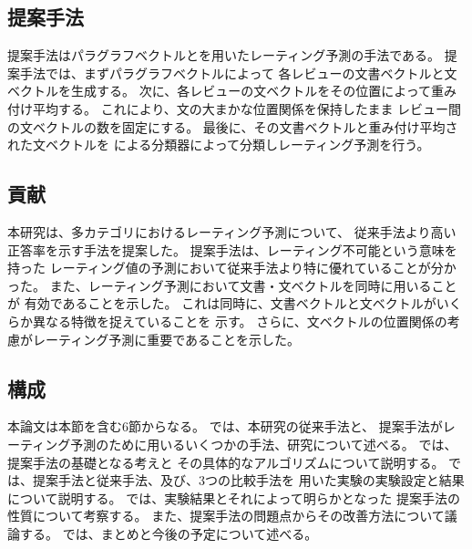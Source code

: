 \subsection{提案手法}

提案手法はパラグラフベクトルと\nn を用いたレーティング予測の手法である。
提案手法では、まずパラグラフベクトル\cite{quoc14}によって
各レビューの文書ベクトルと文ベクトルを生成する。
次に、各レビューの文ベクトルをその位置によって重み付け平均する。
これにより、文の大まかな位置関係を保持したまま
レビュー間の文ベクトルの数を固定にする。
最後に、その文書ベクトルと重み付け平均された文ベクトルを
\nn による分類器によって分類しレーティング予測を行う。


\subsection{貢献}

本研究は、多カテゴリにおけるレーティング予測について、
従来手法\cite{fujitani15}より高い正答率を示す手法を提案した。
提案手法は、レーティング不可能という意味を持った
レーティング値の予測において従来手法より特に優れていることが分かった。
また、レーティング予測において文書・文ベクトルを同時に用いることが
有効であることを示した。
これは同時に、文書ベクトルと文ベクトルがいくらか異なる特徴を捉えていることを
示す。
さらに、文ベクトルの位置関係の考慮がレーティング予測に重要であることを示した。


\subsection{構成}

本論文は本節を含む6節からなる。
では、本研究の従来手法\cite{fujitani15}と、
提案手法がレーティング予測のために用いるいくつかの手法、研究について述べる。
では、提案手法の基礎となる考えと
その具体的なアルゴリズムについて説明する。
では、提案手法と従来手法、及び、3つの比較手法を
用いた実験の実験設定と結果について説明する。
では、実験結果とそれによって明らかとなった
提案手法の性質について考察する。
また、提案手法の問題点からその改善方法について議論する。
では、まとめと今後の予定について述べる。
